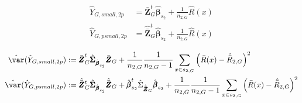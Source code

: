 \begin{subequations}\label{eq:pointest_2p_small_psmall}
\begin{align}
  \hat{Y}_{G,small,2p} & =\bar{\pmb{Z}}_G^t\hat{\pmb{\beta}}_{s_2} + \frac{1}{n_{2,G}}\hat{R}(x)  \label{eq:pointest_2p_reg_small} \\
  \hat{Y}_{G,psmall,2p} & =\hat{\bar{\pmb{Z}}}_G^t\hat{\pmb{\beta}}_{s_2} + \frac{1}{n_{2,G}}\hat{R}(x) \label{eq:pointest_2p_reg_psmall}
\end{align}
\end{subequations}


\begin{subequations}\label{eq:gw_var_2p_reg}
\begin{align}
  \hat{\var}(\hat{Y}_{G,small,2p}) & := \bar{\pmb{Z}}_G^t\hat{\pmb{\Sigma}}_{\hat{\pmb{\beta}}_{s_2}}\bar{\pmb{Z}}_G 
    + \frac{1}{n_{2,G}}\frac{1}{n_{2,G}-1}\sum_{x \in s_{2,G}} \Big(\bar{R}(x)-\hat{\bar{R}}_{2,G}\Big)^2  \label{eq:var_2p_reg_small} \\
    
  \hat{\var}(\hat{Y}_{G,psmall,2p}) & := \hat{\bar{\pmb{Z}}}_G^t\hat{\pmb{\Sigma}}_{\hat{\pmb{\beta}}_{s_2}}\hat{\bar{\pmb{Z}}}_G
  + \hat{\pmb{\beta}}_{s_2}^t\hat{\Sigma}_{\hat{\bar{\pmb{Z}}}_G}\hat{\pmb{\beta}}_{s_2} 
  + \frac{1}{n_{2,G}}\frac{1}{n_{2,G}-1}\sum_{x \in s_{2,G}} \Big(\bar{R}(x)-\hat{\bar{R}}_{2,G}\Big)^2  \label{eq:var_2p_reg_psmall}
\end{align}
\end{subequations}
